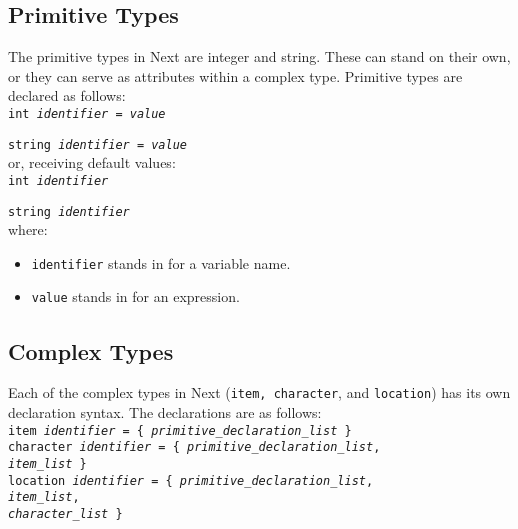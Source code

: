 \documentclass[12pt]{article}
\begin{document}
\subsection{Primitive Types}
The primitive types in Next are integer and string.  These can stand on their own, or they can serve as attributes within a complex type.  Primitive types are declared as follows: \\

\texttt{int \textit{identifier} = \textit{value}}

\texttt{string \textit{identifier} = \textit{value}} \\ 

\noindent or, receiving default values: \\

\texttt{int \textit{identifier}}

\texttt{string \textit{identifier}} \\ 

\noindent where:
\begin{itemize}
\item \texttt{identifier} stands in for a variable name.
\item \texttt{value} stands in for an expression.
\end{itemize}

\subsection{Complex Types}
Each of the complex types in Next (\texttt{item, character}, and \texttt{location}) has its own declaration syntax.  The declarations are as follows: \\

\texttt{item \textit{identifier} = \{ \textit{primitive\_declaration\_list} \}} \\

\texttt{character \textit{identifier} = \{ \textit{primitive\_declaration\_list}, \\
\indent \indent \indent \indent \indent \indent \indent \indent \indent \indent  \textit{item\_list} \} } \\

\texttt{location \textit{identifier} = \{ \textit{primitive\_declaration\_list}, \\
\indent \indent \indent \indent \indent \indent \indent \indent \indent \indent  \textit{item\_list}, \\
\indent \indent \indent \indent \indent \indent \indent \indent \indent \indent  \textit{character\_list} \}} \\
\end{document}

